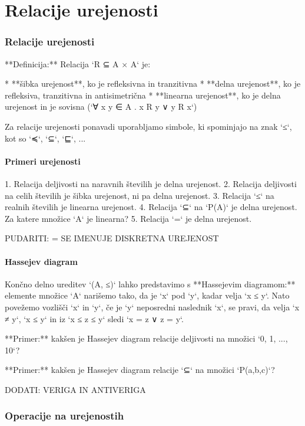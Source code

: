 \chapter{Relacije urejenosti}

\subsection{Relacije urejenosti}

**Definicija:** Relacija `R ⊆ A × A` je:

* **šibka urejenost**, ko je refleksivna in tranzitivna
* **delna urejenost**, ko je refleksiva, tranzitivna in antisimetrična
* **linearna urejenost**, ko je delna urejenost in je sovisna (`∀ x y ∈ A . x R y ∨ y R x`)

Za relacije urejenosti ponavadi uporabljamo simbole, ki spominjajo na znak `≤`, kot so `≼`, `⊆`, `⊑`, ...

\subsubsection{Primeri urejenosti}

1. Relacija deljivosti na naravnih številih je delna urejenost.
2. Relacija deljivosti na celih številih je šibka urejenost, ni pa delna urejenost.
3. Relacija `≤` na realnih številih je linearna urejenost.
4. Relacija `⊆` na `P(A)` je delna urejenost. Za katere množice `A` je linearna?
5. Relacija `=` je delna urejenost.

PUDARITI: = SE IMENUJE DISKRETNA UREJENOST

\subsubsection{Hassejev diagram}

Končno delno ureditev `(A, ≤)` lahko predstavimo s **Hassejevim diagramom:** elemente
množice `A` narišemo tako, da je `x` pod `y`, kadar velja `x ≤ y`. Nato povežemo vozlišči
`x` in `y`, če je `y` neposredni naslednik `x`, se pravi, da velja `x ≠ y`, `x ≤ y` in iz
`x ≤ z ≤ y` sledi `x = z ∨ z = y`.

**Primer:** kakšen je Hassejev diagram relacije deljivosti na množici `{0, 1, ..., 10}`?

**Primer:** kakšen je Hassejev diagram relacije `⊆` na množici `P({a,b,c})`?

DODATI: VERIGA IN ANTIVERIGA

\subsection{Operacije na urejenostih}

